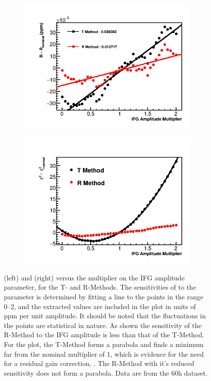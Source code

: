 \begin{figure}[h]
\centering
    \begin{subfigure}[t]{0.45\textwidth}
        \centering
        \includegraphics[width=\textwidth]{IFG_Amplitude_Compare_R}
    \end{subfigure}%
    \hspace{1cm}
    \begin{subfigure}[t]{0.45\textwidth}
        \centering
        \includegraphics[width=\textwidth]{IFG_Amplitude_Compare_Chisq}
    \end{subfigure}
\caption[]{\R (left) and \chisq (right) versus the multiplier on the IFG amplitude parameter, for the T- and R-Methods. The sensitivities of \R to the parameter is determined by fitting a line to the points in the range 0--2, and the extracted values are included in the plot in units of ppm per unit amplitude. It should be noted that the fluctuations in the points are statistical in nature. As shown the sensitivity of the R-Method to the IFG amplitude is less than that of the T-Method. For the \chisq plot, the T-Method forms a parabola and finds a minimum far from the nominal multiplier of 1, which is evidence for the need for a residual gain correction, . The R-Method with it's reduced sensitivity does not form a parabola. Data are from the 60h dataset.}

\end{figure}
